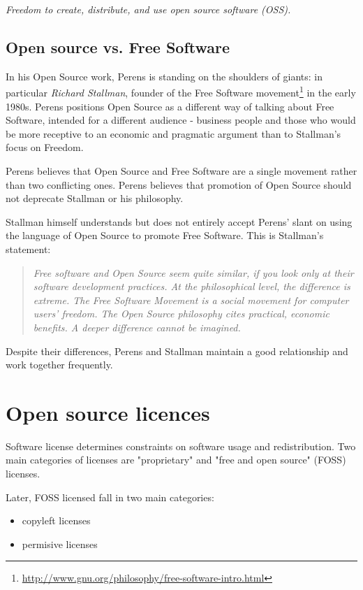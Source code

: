 \documentclass[times, utf8, seminar]{fit}
\begin{document}
\begin{center}
\emph{\large{Freedom to create, distribute, and use open source software (OSS).}}
\end{center}


\subsection{Open source vs. Free Software}

In his Open Source work, Perens is standing on the shoulders of giants: in particular \emph{Richard Stallman}, founder of the Free Software movement\footnote{\url{http://www.gnu.org/philosophy/free-software-intro.html}} in the early 1980s. Perens positions Open Source as a different way of talking about Free Software, intended for a different audience - business people and those who would be more receptive to an economic and pragmatic argument than to Stallman's focus on Freedom\citep{web:perens}.

Perens believes that Open Source and Free Software are a single movement rather than two conflicting ones. Perens believes that promotion of Open Source should not deprecate Stallman or his philosophy.

Stallman himself understands but does not entirely accept Perens' slant on using the language of Open Source to promote Free Software. This is Stallman's statement:

\begin{quotation}
\emph{Free software and Open Source seem quite similar, if you look only at their software development practices. At the philosophical level, the difference is extreme. The Free Software Movement is a social movement for computer users' freedom. The Open Source philosophy cites practical, economic benefits. A deeper difference cannot be imagined.}
\end{quotation}

Despite their differences, Perens and Stallman maintain a good relationship and work together frequently.
\section{Open source licences}

Software license determines constraints on software usage and redistribution. Two main categories of licenses are "proprietary" and "free and open source" (FOSS) licenses.

Later, FOSS licensed fall in two main categories:
\begin{itemize}
  \item copyleft licenses
  \item permisive licenses 
\end{itemize} 
\end{document}
